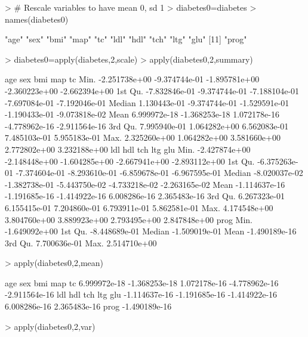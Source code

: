 \documentclass{article}
\begin{document}
\begin{Schunk}
\begin{Sinput}
> # Rescale variables to have mean 0, sd 1
> diabetes0=diabetes
> names(diabetes0)
\end{Sinput}
\begin{Soutput}
 [1] "age"  "sex"  "bmi"  "map"  "tc"   "ldl"  "hdl"  "tch"  "ltg"  "glu" 
[11] "prog"
\end{Soutput}
\begin{Sinput}
> diabetes0=apply(diabetes,2,scale)
> apply(diabetes0,2,summary)
\end{Sinput}
\begin{Soutput}
                  age           sex           bmi           map            tc
Min.    -2.251738e+00 -9.374744e-01 -1.895781e+00 -2.360223e+00 -2.662394e+00
1st Qu. -7.832846e-01 -9.374744e-01 -7.188104e-01 -7.697084e-01 -7.192046e-01
Median   1.130443e-01 -9.374744e-01 -1.529591e-01 -1.190433e-01 -9.073818e-02
Mean     6.999972e-18 -1.368253e-18  1.072178e-16 -4.778962e-16 -2.911564e-16
3rd Qu.  7.995940e-01  1.064282e+00  6.562083e-01  7.485103e-01  5.955183e-01
Max.     2.325260e+00  1.064282e+00  3.581660e+00  2.772802e+00  3.232188e+00
                  ldl           hdl           tch           ltg           glu
Min.    -2.427874e+00 -2.148448e+00 -1.604285e+00 -2.667941e+00 -2.893112e+00
1st Qu. -6.375263e-01 -7.374604e-01 -8.293610e-01 -6.859678e-01 -6.967595e-01
Median  -8.020037e-02 -1.382738e-01 -5.443750e-02 -4.733218e-02 -2.263165e-02
Mean    -1.114637e-16 -1.191685e-16 -1.414922e-16  6.008286e-16  2.365483e-16
3rd Qu.  6.267323e-01  6.155415e-01  7.204860e-01  6.793911e-01  5.862581e-01
Max.     4.174548e+00  3.804760e+00  3.889923e+00  2.793495e+00  2.847848e+00
                 prog
Min.    -1.649092e+00
1st Qu. -8.448689e-01
Median  -1.509019e-01
Mean    -1.490189e-16
3rd Qu.  7.700636e-01
Max.     2.514710e+00
\end{Soutput}
\begin{Sinput}
> apply(diabetes0,2,mean)
\end{Sinput}
\begin{Soutput}
          age           sex           bmi           map            tc 
 6.999972e-18 -1.368253e-18  1.072178e-16 -4.778962e-16 -2.911564e-16 
          ldl           hdl           tch           ltg           glu 
-1.114637e-16 -1.191685e-16 -1.414922e-16  6.008286e-16  2.365483e-16 
         prog 
-1.490189e-16 
\end{Soutput}
\begin{Sinput}
> apply(diabetes0,2,var)

\end{Sinput}
\end{Schunk}
\end{document}
